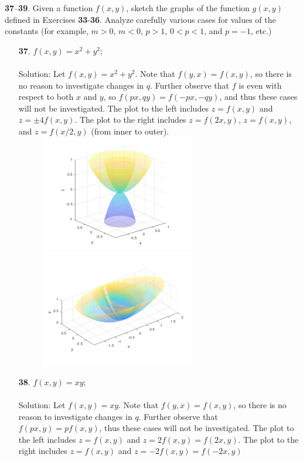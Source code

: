 \documentclass[12pt]{amsbook}
\begin{document}
\noindent
{\small {\bf 37}--{\bf 39}}. Given a function $f(x, y)$, sketch the graphs of the function $g(x, y)$
defined in Exercises {\bf 33}-{\bf 36}. Analyze carefully various cases for values of the
constants (for example, $m > 0$, $m < 0$, $p > 1$, $0 < p < 1$, and $p = -1$, etc.)
\begin{enumerate}
  \item[{\small\bf 37}.] $f(x,y)=x^2+y^2$;
  \\
  \\
  {\sc Solution}: Let $f(x,y)=x^2+y^2$. Note that $f(y,x)=f(x,y)$, so there is no reason to investigate changes in $q$. Further observe that $f$ is even with respect to both $x$ and $y$, so $f(px,qy)=f(-px,-qy)$, and thus these cases will not be investigated. The plot to the left includes $z=f(x,y)$ and $z=\pm 4f(x,y)$. The plot to the right includes $z=f(2x,y)$, $z=f(x,y)$, and $z=f(x/2,y)$ (from inner to outer).
  \\
  \includegraphics[width=3.5in,height=2.0in]{3_1_37_1.png}
  \includegraphics[width=3.5in,height=2.0in]{3_1_37_2.png}
  \item[{\small\bf 38}.] $f(x,y)=xy$;
  \\
  \\
  {\sc Solution}: Let $f(x,y)=xy$. Note that $f(y,x)=f(x,y)$, so there is no reason to investigate changes in $q$. Further observe that $f(px,y)=pf(x,y)$, thus these cases will not be investigated. The plot to the left includes $z=f(x,y)$ and $z=2f(x,y)=f(2x,y)$. The plot to the right includes $z=f(x,y)$ and $z=-2f(x,y)=f(-2x,y)$

\end{enumerate}
\end{document}
